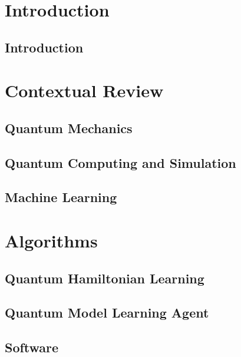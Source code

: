 
\part*{Introduction}\label{part:intro}
    \chapter{Introduction}\label{chapter:intro}
        

\part{Contextual Review}\label{part:contextual_review}
    \chapter{Quantum Mechanics}\label{chapter:qm}
        
    \chapter{Quantum Computing and Simulation}\label{chapter:qc}
        
    \chapter{Machine Learning}\label{chapter:ml}
        

\part{Algorithms}\label{part:algorithms}
    \chapter{Quantum Hamiltonian Learning}\label{chapter:qhl}
        
    \chapter{Quantum Model Learning Agent}\label{chapter:qmla}
        
    \chapter{Software}\label{chapter:sw}
        

